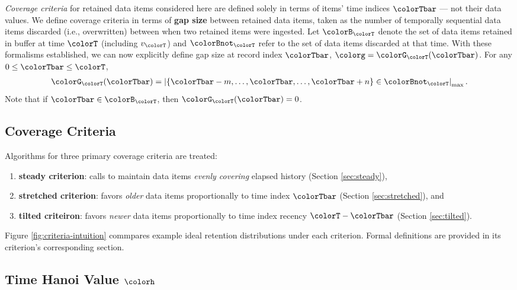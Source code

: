 \textit{Coverage criteria} for retained data items considered here are defined solely in terms of items' time indices $\colorTbar$ --- not their data values.
We define coverage criteria in terms of \textbf{gap size} between retained data items, taken as the number of temporally sequential data items discarded (i.e., overwritten) between when two retained items were ingested.
Let $\colorB_{\colorT}$ denote the set of data items retained in buffer at time $\colorT$ (including $v_{\colorT}$) and $\colorBnot_{\colorT}$ refer to the set of data items discarded at that time.
With these formalisms established, we can now explicitly define gap size at record index $\colorTbar$, $\colorg = \colorG_{\colorT}(\colorTbar)$.
For any $0 \leq \colorTbar \leq \colorT$,
\begin{align*}
\colorG_{\colorT}(\colorTbar) = \left| \{\colorTbar - m, \ldots, \colorTbar, \ldots, \colorTbar+n\} \in \colorBnot_{\colorT} \right|_\mathrm{max}.
\end{align*}
Note that if $\colorTbar \in \colorB_{\colorT}$, then $\colorG_{\colorT}(\colorTbar) = 0$.

\subsection{Coverage Criteria}

Algorithms for three primary coverage criteria are treated:
\begin{enumerate}
\item \textbf{steady criterion}: calls to maintain data items \textit{evenly covering} elapsed history (Section \ref{sec:steady}),
\item \textbf{stretched criterion}: favors \textit{older} data items proportionally to time index $\colorTbar$ (Section \ref{sec:stretched}), and
\item \textbf{tilted criteiron}: favors \textit{newer} data items proportionally to time index recency $\colorT - \colorTbar$ (Section \ref{sec:tilted}).
\end{enumerate}
Figure \ref{fig:criteria-intuition} commpares example ideal retention distributions under each criterion.
Formal definitions are provided in its criterion's corresponding section.

\subsection{Time Hanoi Value $\colorh$}



